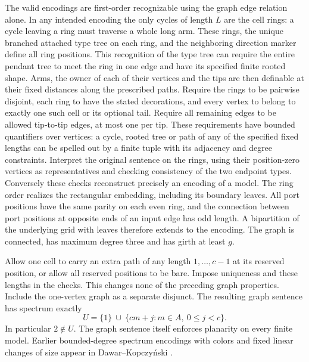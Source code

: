 \documentclass[11pt]{article}
\begin{document}
The valid encodings are first-order recognizable using the graph edge relation alone. In any intended encoding the only cycles of length $L$ are the cell rings: a cycle leaving a ring must traverse a whole long arm. These rings, the unique branched attached type tree on each ring, and the neighboring direction marker define all ring positions. This recognition of the type tree can require the entire pendant tree to meet the ring in one edge and have its specified finite rooted shape. Arms, the owner of each of their vertices and the tips are then definable at their fixed distances along the prescribed paths. Require the rings to be pairwise disjoint, each ring to have the stated decorations, and every vertex to belong to exactly one such cell or its optional tail. Require all remaining edges to be allowed tip-to-tip edges, at most one per tip. These requirements have bounded quantifiers over vertices: a cycle, rooted tree or path of any of the specified fixed lengths can be spelled out by a finite tuple with its adjacency and degree constraints. Interpret the original sentence on the rings, using their position-zero vertices as representatives and checking consistency of the two endpoint types. Conversely these checks reconstruct precisely an encoding of a model. The ring order realizes the rectangular embedding, including its boundary leaves. All port positions have the same parity on each even ring, and the connection between port positions at opposite ends of an input edge has odd length. A bipartition of the underlying grid with leaves therefore extends to the encoding. The graph is connected, has maximum degree three and has girth at least $g$.

Allow one cell to carry an extra path of any length $1,\ldots,c-1$ at its reserved position, or allow all reserved positions to be bare. Impose uniqueness and these lengths in the checks. This changes none of the preceding graph properties. Include the one-vertex graph as a separate disjunct. The resulting graph sentence has spectrum exactly
\[
                U=\{1\}\ \cup\ \{cm+j:m\in A,\ 0\le j<c\}.
\]
In particular $2\notin U$. The graph sentence itself enforces planarity on every finite model. Earlier bounded-degree spectrum encodings with colors and fixed linear changes of size appear in Dawar--Kopczyński \cite[Theorem 2.4]{dk}.
\end{document}
